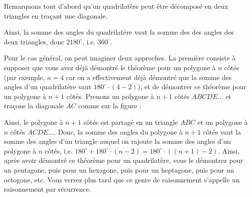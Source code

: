 \begin{preuve}
Remarquons tout d'abord qu'un quadrilatère peut être décomposé en deux triangles en traçant une diagonale.
\begin{figure}[H]
\end{figure}
Ainsi, la somme des angles du quadrilatère vaut la somme des des angles des deux triangles, donc $2 \dot 180^\circ$, i.e. $360^\circ$.

Pour le cas général, on peut imaginer deux approches. La première consiste à supposer que vous avez déjà démontré le théorème pour un polygone à $n$ côtés (par exemple, $n=4$ car on a effectivement déjà démontré que la somme des angles d'un quadrilatère vaut $180^\circ \cdot (4-2)$), et de démontrer ce théorème pour un polygone à $n + 1$ côtés. Prenons un polygone à $n + 1$ côtés $ABCDE\dots$ et traçons la diagonale $AC$ comme sur la figure :
\begin{figure}[H]
\end{figure}
Ainsi, le polygone à $n + 1$ côtés est partagé en un triangle $ABC$ et un polygone à $n$ côtés $ACDE\dots$. Donc, la somme des angles du polygone à $n + 1$ côtés vaut la somme des angles d'un triangle auquel on rajoute la somme des angles d'un polygone à $n$ côtés, i.e. $180^\circ+180^\circ\cdot(n-2)=180^\circ\cdot((n + 1)-2)$. Ainsi, après avoir démontré ce théorème pour un quadrilatère, vous le démontrez pour un pentagone, puis pour un hexagone, puis pour un heptagone, puis pour un octogone, etc. Vous verrez plus tard que ce genre de raisonnement s'appelle un raisonnement par récurrence.


\end{preuve}
